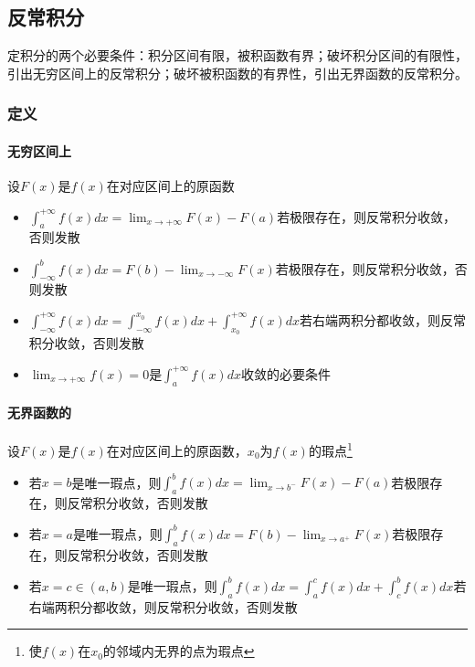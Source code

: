 \subsection{反常积分}
定积分的两个必要条件：积分区间有限，被积函数有界；破坏积分区间的有限性，引出无穷区间上的反常积分；破坏被积函数的有界性，引出无界函数的反常积分。
\subsubsection{定义}

\paragraph{无穷区间上}
设\(F(x)\)是\(f(x)\)在对应区间上的原函数
\begin{itemize}
    \item \(\displaystyle\int_a^{+\infty}f(x)dx = \lim_{x \to +\infty}F(x) - F(a)\)若极限存在，则反常积分收敛，否则发散
    \item \(\displaystyle\int_{-\infty}^bf(x)dx = F(b) - \lim_{x \to -\infty}F(x)\)若极限存在，则反常积分收敛，否则发散
    \item \(\displaystyle\int_{-\infty}^{+\infty}f(x)dx = \int_{-\infty}^{x_0}f(x)dx + \int_{x_0}^{+\infty}f(x)dx\)若右端两积分都收敛，则反常积分收敛，否则发散
    \item \(\displaystyle\lim_{x \to +\infty}f(x) = 0\)是\(\displaystyle\int_a^{+\infty}f(x)dx\)收敛的必要条件
\end{itemize}

\paragraph{无界函数的}
设\(F(x)\)是\(f(x)\)在对应区间上的原函数，\(x_0\)为\(f(x)\)的瑕点\footnote{使\(f(x)\)在\(x_0\)的邻域内无界的点为瑕点}
\begin{itemize}
    \item 若\(x = b\)是唯一瑕点，则\(\displaystyle\int_a^{b}f(x)dx = \lim_{x \to b^-}F(x) - F(a)\)若极限存在，则反常积分收敛，否则发散
    \item 若\(x = a\)是唯一瑕点，则\(\displaystyle\int_{a}^bf(x)dx = F(b) - \lim_{x \to a^+}F(x)\)若极限存在，则反常积分收敛，否则发散
    \item 若\(x = c \in (a, b)\)是唯一瑕点，则\(\displaystyle\int_{a}^{b}f(x)dx = \int_{a}^{c}f(x)dx + \int_{c}^{b}f(x)dx\)若右端两积分都收敛，则反常积分收敛，否则发散
\end{itemize}


